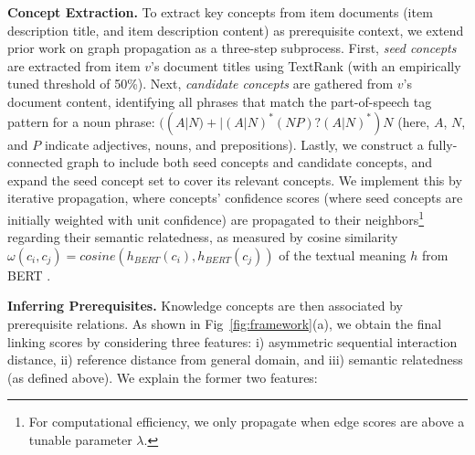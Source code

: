 \textbf{Concept Extraction.}
\label{sec:data_construct}
To extract key concepts from item documents (item description title, and item description content) as prerequisite context,
we extend prior work \cite{pan2017course} on graph propagation as a three-step subprocess.
First, \textit{seed concepts} are extracted from item $v$'s document titles using TextRank \cite{mihalcea2004textrank} (with an empirically tuned threshold of 50\%).
Next, \textit{candidate concepts} are gathered from $v$'s document content, identifying all phrases that match the part-of-speech tag pattern for a noun phrase: $((A|N)+|(A|N)^{*}(NP)?(A|N)^{*})N$ \cite{justeson1995technical} (here, $A$, $N$, and $P$ indicate adjectives, nouns, and prepositions). 
Lastly, we construct a fully-connected graph to include both seed concepts and candidate concepts, and expand the seed concept set to cover its relevant concepts. We implement this by iterative propagation, where concepts' confidence scores
(where seed concepts are initially weighted with unit confidence)
are propagated to their neighbors\footnote{For computational efficiency, we only propagate when edge scores are above a tunable parameter $\lambda$.} regarding their semantic relatedness, as measured by cosine similarity $\omega(c_{i},c_{j})=cosine(h_{BERT}(c_{i}),h_{BERT}(c_{j}))$ of the textual meaning $h$ from BERT \cite{devlin2018bert}. 

\textbf{Inferring Prerequisites.} Knowledge concepts are then associated by prerequisite relations. 
As shown in Fig~\ref{fig:framework}(a), we obtain the final linking scores by considering three features: 
i) asymmetric sequential interaction distance, 
ii) reference distance from general domain,
and iii) semantic relatedness (as defined above).
We explain the former two features:



